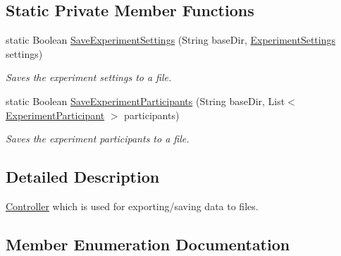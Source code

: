 \subsection*{Static Private Member Functions}
\begin{DoxyCompactItemize}
\item 
static Boolean \hyperlink{class_web_analyzer_1_1_controller_1_1_export_controller_a24897eb8742a86b8d8873821baec50c6}{Save\+Experiment\+Settings} (String base\+Dir, \hyperlink{class_web_analyzer_1_1_models_1_1_settings_model_1_1_experiment_settings}{Experiment\+Settings} settings)
\begin{DoxyCompactList}\small\item\em Saves the experiment settings to a file. \end{DoxyCompactList}\item 
static Boolean \hyperlink{class_web_analyzer_1_1_controller_1_1_export_controller_a08b47c29f0fc8ab174158615747b6fa0}{Save\+Experiment\+Participants} (String base\+Dir, List$<$ \hyperlink{class_web_analyzer_1_1_models_1_1_base_1_1_experiment_participant}{Experiment\+Participant} $>$ participants)
\begin{DoxyCompactList}\small\item\em Saves the experiment participants to a file. \end{DoxyCompactList}\end{DoxyCompactItemize}


\subsection{Detailed Description}
\hyperlink{namespace_web_analyzer_1_1_controller}{Controller} which is used for exporting/saving data to files. 



\subsection{Member Enumeration Documentation}
\hypertarget{class_web_analyzer_1_1_controller_1_1_export_controller_a8cea4a311ecaf495f305f9d7829a57aa}{}
